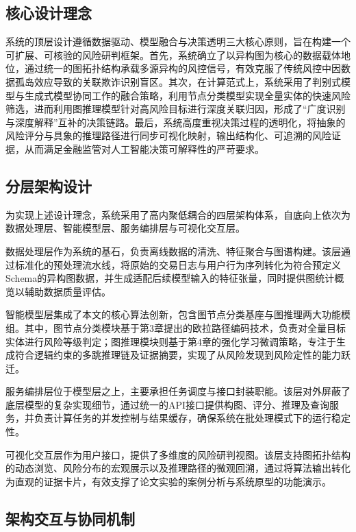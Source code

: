 \subsection{核心设计理念}

系统的顶层设计遵循数据驱动、模型融合与决策透明三大核心原则，旨在构建一个可扩展、可核验的风险研判框架。首先，系统确立了以异构图为核心的数据载体地位，通过统一的图拓扑结构承载多源异构的风控信号，有效克服了传统风控中因数据孤岛效应导致的关联欺诈识别盲区。其次，在计算范式上，系统采用了判别式模型与生成式模型协同工作的融合策略，利用节点分类模型实现全量实体的快速风险筛选，进而利用图推理模型针对高风险目标进行深度关联归因，形成了“广度识别与深度解释”互补的决策链路。最后，系统高度重视决策过程的透明化，将抽象的风险评分与具象的推理路径进行同步可视化映射，输出结构化、可追溯的风险证据，从而满足金融监管对人工智能决策可解释性的严苛要求。

\subsection{分层架构设计}

为实现上述设计理念，系统采用了高内聚低耦合的四层架构体系，自底向上依次为数据处理层、智能模型层、服务编排层与可视化交互层。

数据处理层作为系统的基石，负责离线数据的清洗、特征聚合与图谱构建。该层通过标准化的预处理流水线，将原始的交易日志与用户行为序列转化为符合预定义Schema的异构图数据，并生成适配后续模型输入的特征张量，同时提供图统计概览以辅助数据质量评估。

智能模型层集成了本文的核心算法创新，包含图节点分类基座与图推理两大功能模组。其中，图节点分类模块基于第3章提出的欧拉路径编码技术，负责对全量目标实体进行风险等级判定；图推理模块则基于第4章的强化学习微调策略，专注于生成符合逻辑约束的多跳推理链及证据摘要，实现了从风险发现到风险定性的能力跃迁。

服务编排层位于模型层之上，主要承担任务调度与接口封装职能。该层对外屏蔽了底层模型的复杂实现细节，通过统一的API接口提供构图、评分、推理及查询服务，并负责计算任务的并发控制与结果缓存，确保系统在批处理模式下的运行稳定性。

可视化交互层作为用户接口，提供了多维度的风险研判视图。该层支持图拓扑结构的动态浏览、风险分布的宏观展示以及推理路径的微观回溯，通过将算法输出转化为直观的证据卡片，有效支撑了论文实验的案例分析与系统原型的功能演示。

\subsection{架构交互与协同机制}


